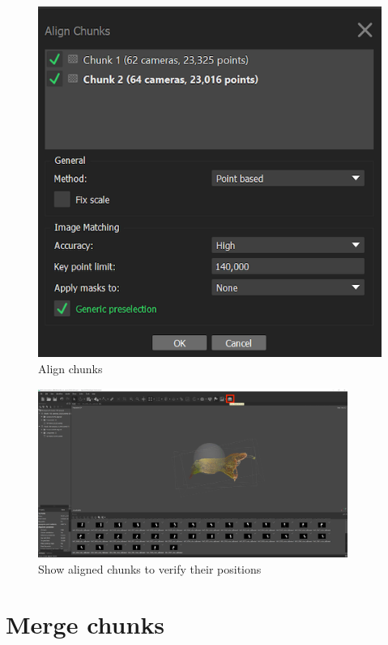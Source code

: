 \documentclass[
]{book}
\begin{document}
\begin{figure}
\hypertarget{Align_chunk}{%
\centering
\includegraphics[width=1\textwidth,height=\textheight]{Figures/metashape_align_chunks.png}
\caption{Align chunks}\label{Align_chunk}
}
\end{figure}

\begin{figure}
\hypertarget{show_aligned_chunk}{%
\centering
\includegraphics[width=0.9\textwidth,height=\textheight]{Figures/metashape_show_aligned_chunks.png}
\caption{Show aligned chunks to verify their
positions}\label{show_aligned_chunk}
}
\end{figure}

\hypertarget{merge-chunks}{%
\section{Merge chunks}\label{merge-chunks}}
\end{document}
